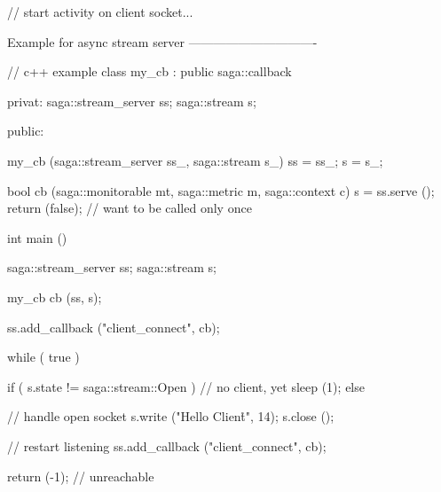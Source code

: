 \begin{mycode}
        // start activity on client socket...
 
 
  Example for async stream server
  -------------------------------
 
    // c++ example
    class my_cb : public saga::callback
    {
      privat:
        saga::stream_server ss;
        saga::stream        s;
 
      public:
 
        my_cb (saga::stream_server ss_,
               saga::stream        s_)
        {
          ss = ss_;
          s   = s_;
        }
 
        bool cb (saga::monitorable mt,
                 saga::metric      m,
                 saga::context     c)
        {
          s = ss.serve ();
          return (false); // want to be called only once
        }
     }
 
     int main ()
     {
       saga::stream_server ss;
       saga::stream        s;

       my_cb cb (ss, s);
 
       ss.add_callback ("client_connect", cb);
 
       while ( true )
       {
         if ( s.state != saga::stream::Open )
         {
           // no client, yet
           sleep (1);
         }
         else
         {
           // handle open socket
           s.write ("Hello Client\r\n", 14);
           s.close ();
 
           // restart listening
           ss.add_callback ("client_connect", cb);
         }
       }
 
       return (-1); // unreachable
     }
 \end{mycode}
 
